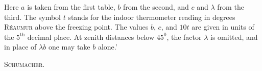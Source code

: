 Here $a$ is taken from the first table, $b$ from the second, and $c$ and $\lambda$ from the third. The symbol $t$ stands for the indoor thermometer reading in degrees \textsc{Réaumur} above the freezing point. The values $b$, $c$, and $10t$ are given in units of the $5^{\mathrm{th}}$ decimal place. At zenith distances below $45^0$, the factor $\lambda$ is omitted, and in place of $\lambda b$ one may take $b$ alone.'
\begin{flushright}\textsc{Schumacher.}\end{flushright}
\clearpage{}%
\begin{center}
\begingroup\setlength{\fboxsep}{1.2pt}\setlength{\fboxrule}{0.45pt}
\end{center}
